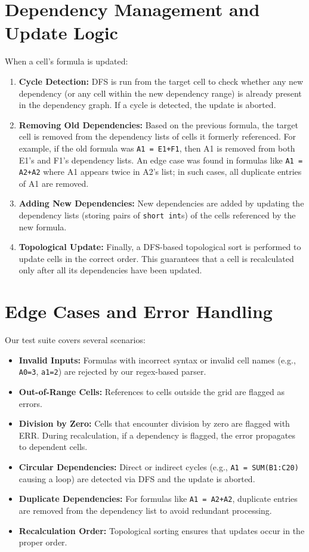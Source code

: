 \documentclass[10pt]{article}
\begin{document}
\section{Dependency Management and Update Logic}
When a cell’s formula is updated:
\begin{enumerate}[noitemsep]
    \item \textbf{Cycle Detection:} DFS is run from the target cell to check whether any new dependency (or any cell within the new dependency range) is already present in the dependency graph. If a cycle is detected, the update is aborted.
    \item \textbf{Removing Old Dependencies:} Based on the previous formula, the target cell is removed from the dependency lists of cells it formerly referenced. For example, if the old formula was \texttt{A1 = E1+F1}, then A1 is removed from both E1’s and F1’s dependency lists. An edge case was found in formulas like \texttt{A1 = A2+A2} where A1 appears twice in A2’s list; in such cases, all duplicate entries of A1 are removed.
    \item \textbf{Adding New Dependencies:} New dependencies are added by updating the dependency lists (storing pairs of \texttt{short int}s) of the cells referenced by the new formula.
    \item \textbf{Topological Update:} Finally, a DFS-based topological sort is performed to update cells in the correct order. This guarantees that a cell is recalculated only after all its dependencies have been updated.
\end{enumerate}

\section{Edge Cases and Error Handling}
Our test suite covers several scenarios:
\begin{itemize}[noitemsep]
    \item \textbf{Invalid Inputs:} Formulas with incorrect syntax or invalid cell names (e.g., \texttt{A0=3}, \texttt{a1=2}) are rejected by our regex-based parser.
    \item \textbf{Out-of-Range Cells:} References to cells outside the grid are flagged as errors.
    \item \textbf{Division by Zero:} Cells that encounter division by zero are flagged with ERR. During recalculation, if a dependency is flagged, the error propagates to dependent cells.
    \item \textbf{Circular Dependencies:} Direct or indirect cycles (e.g., \texttt{A1 = SUM(B1:C20)} causing a loop) are detected via DFS and the update is aborted.
    \item \textbf{Duplicate Dependencies:} For formulas like \texttt{A1 = A2+A2}, duplicate entries are removed from the dependency list to avoid redundant processing.
    \item \textbf{Recalculation Order:} Topological sorting ensures that updates occur in the proper order.
\end{itemize}
\end{document}
